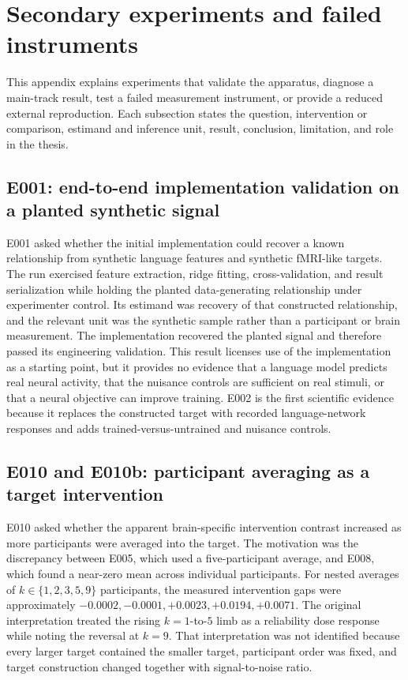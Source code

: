 \section{Secondary experiments and failed instruments}
\label{app:secondary}

This appendix explains experiments that validate the apparatus, diagnose a main-track result, test a failed measurement instrument, or provide a reduced external reproduction.
Each subsection states the question, intervention or comparison, estimand and inference unit, result, conclusion, limitation, and role in the thesis.

\subsection{E001: end-to-end implementation validation on a planted synthetic signal}
\label{sec:e001}

E001 asked whether the initial implementation could recover a known relationship from synthetic language features and synthetic fMRI-like targets.
The run exercised feature extraction, ridge fitting, cross-validation, and result serialization while holding the planted data-generating relationship under experimenter control.
Its estimand was recovery of that constructed relationship, and the relevant unit was the synthetic sample rather than a participant or brain measurement.
The implementation recovered the planted signal and therefore passed its engineering validation. 
This result licenses use of the implementation as a starting point, but it provides no evidence that a language model predicts real neural activity, that the nuisance controls are sufficient on real stimuli, or that a neural objective can improve training.
E002 is the first scientific evidence because it replaces the constructed target with recorded language-network responses and adds trained-versus-untrained and nuisance controls.

\subsection{E010 and E010b: participant averaging as a target intervention}
\label{sec:e010}

E010 asked whether the apparent brain-specific intervention contrast increased as more participants were averaged into the target.
The motivation was the discrepancy between E005, which used a five-participant average, and E008, which found a near-zero mean across individual participants.
For nested averages of $k\in\{1,2,3,5,9\}$ participants, the measured intervention gaps were approximately $-0.0002,-0.0001,+0.0023,+0.0194,+0.0071$. 
The original interpretation treated the rising $k=1$-to-$5$ limb as a reliability dose response while noting the reversal at $k=9$.
That interpretation was not identified because every larger target contained the smaller target, participant order was fixed, and target construction changed together with signal-to-noise ratio.

